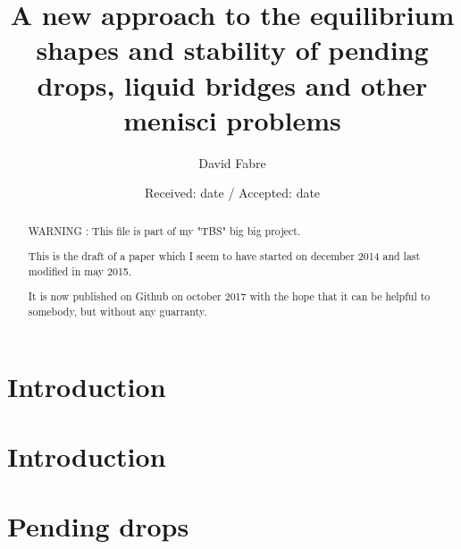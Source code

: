\title{A new approach to the equilibrium shapes and stability of pending drops, liquid bridges
and other menisci problems}



\author{David Fabre
}



\date{Received: date / Accepted: date}


\maketitle

\begin{abstract}

WARNING :
This file is part of my "TBS" big big project. 

This is the draft of a paper which I seem to have started on december 2014 and last modified in may 2015.

It is now published on Github on october 2017 
with the hope that it can be helpful to somebody, but without any guarranty.



\end{abstract}

\section{Introduction}





\section{Introduction}

\section{Pending drops}

